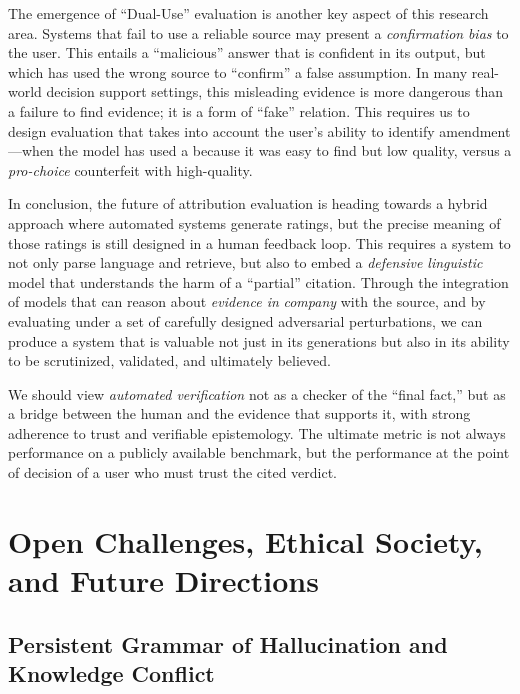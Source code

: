 \documentclass[11pt]{article}
\begin{document}
The emergence of ``Dual-Use'' evaluation is another key aspect of this research area. Systems that fail to use a reliable source may present a \emph{confirmation} \emph{bias} to the user. This entails a ``malicious'' answer that is confident in its output, but which has used the wrong source to ``confirm'' a false assumption. In many real-world decision support settings, this misleading evidence is more dangerous than a failure to find evidence; it is a form of ``fake'' relation. This requires us to design evaluation that takes into account the user's ability to identify amendment---when the model has used a because it was easy to find but low quality, versus a \emph{pro-choice} counterfeit with high-quality.

In conclusion, the future of attribution evaluation is heading towards a hybrid approach where automated systems generate ratings, but the precise meaning of those ratings is still designed in a human feedback loop. This requires a system to not only parse language and retrieve, but also to embed a \emph{defensive linguistic} model that understands the harm of a ``partial'' citation. Through the integration of models that can reason about \emph{evidence in} \emph{company} with the source, and by evaluating under a set of carefully designed adversarial perturbations, we can produce a system that is valuable not just in its generations but also in its ability to be scrutinized, validated, and ultimately believed.

We should view \emph{automated verification} not as a checker of the ``final fact,'' but as a bridge between the human and the evidence that supports it, with strong adherence to trust and verifiable epistemology. The ultimate metric is not always performance on a publicly available benchmark, but the performance at the point of decision of a user who must trust the cited verdict.

\section{Open Challenges, Ethical Society, and Future Directions}

\subsection{Persistent Grammar of Hallucination and Knowledge Conflict}
\end{document}
